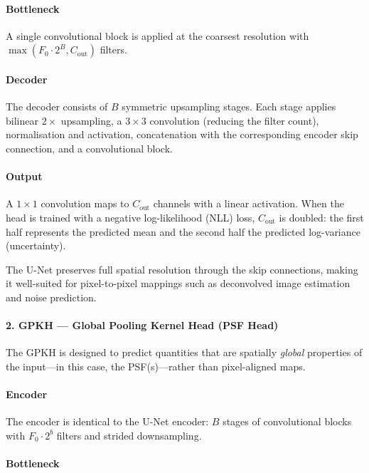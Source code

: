\documentclass{aa}
\begin{document}
\paragraph{Bottleneck}

A single convolutional block is applied at the coarsest resolution with $\max(F_0 \cdot 2^B, C_\mathrm{out})$ filters.

\paragraph{Decoder}

The decoder consists of $B$ symmetric upsampling stages. Each stage applies bilinear $2\times$ upsampling, a $3 \times 3$ convolution (reducing the filter count), normalisation and activation, concatenation with the corresponding encoder skip connection, and a convolutional block.

\paragraph{Output}

A $1 \times 1$ convolution maps to $C_\mathrm{out}$ channels with a linear activation. When the head is trained with a negative log-likelihood (NLL) loss, $C_\mathrm{out}$ is doubled: the first half represents the predicted mean and the second half the predicted log-variance (uncertainty).

The U-Net preserves full spatial resolution through the skip connections, making it well-suited for pixel-to-pixel mappings such as deconvolved image estimation and noise prediction.

\paragraph{2. GPKH --- Global Pooling Kernel Head (PSF Head)}

The GPKH is designed to predict quantities that are spatially \emph{global} properties of the input---in this case, the PSF(s)---rather than pixel-aligned maps.

\paragraph{Encoder}

The encoder is identical to the U-Net encoder: $B$ stages of convolutional blocks with $F_0 \cdot 2^b$ filters and strided downsampling.

\paragraph{Bottleneck}
\end{document}
